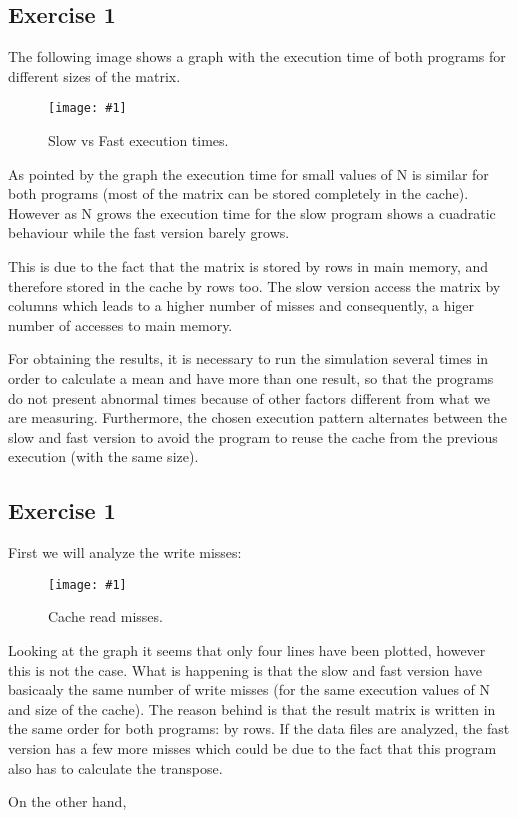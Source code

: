 \documentclass{article}
\newcommand{\myFigure}[4]{%
    \begin{figure}[!ht]
        \texttt{[image: \#1]}
        \centering
        \caption{#2}
        \label{#3}
    \end{figure}
}
\begin{document}
\pagebreak

\subsection*{Exercise 1}

The following image shows a graph with the execution time of both programs for different sizes of the matrix.

\myFigure{../material_P3/out1/mv_att4/slow_fast_time.png}{Slow vs Fast execution times.}{slow_fast_times}{0.4}

As pointed by the graph the execution time for small values of N is similar for both programs (most of the matrix can be stored completely in the cache). However as N grows the execution time for the slow program shows a cuadratic behaviour while the fast version barely grows.

This is due to the fact that the matrix is stored by rows in main memory, and therefore stored in the cache by rows too. The slow version access the matrix by columns which leads to a higher number of misses and consequently, a higer number of accesses to main memory. 

For obtaining the results, it is necessary to run the simulation several times in order to calculate a mean and have more than one result, so that the programs do not present abnormal times because of other factors different from what we are measuring. Furthermore, the chosen execution pattern alternates between the slow and fast version to avoid the program to reuse the cache from the previous execution (with the same size).


\subsection*{Exercise 1}

First we will analyze the write misses: 

\myFigure{../material_P3/out2/mv_att1/cache_escritura.png}{Cache read misses.}{cache_escritura}{0.35}

Looking at the graph it seems that only four lines have been plotted, however this is not the case. What is happening is that the slow and fast version have basicaaly the same number of write misses (for the same execution values of N and size of the cache). The reason behind is that the result matrix is written in the same order for both programs: by rows. If the data files are analyzed, the fast version has a few more misses which could be due to the fact that this program also has to calculate the transpose.

On the other hand, 
\end{document}
